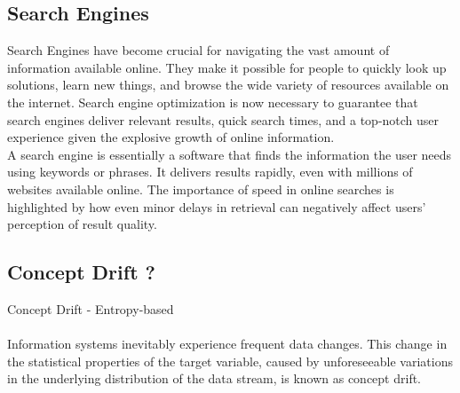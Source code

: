 \documentclass[10pt,oneside,english,a4paper]{article}
\begin{document}
\subsection{Search Engines}
Search Engines have become crucial for navigating the vast amount of information available online. They make it possible for people to quickly look up solutions, learn new things, and browse the wide variety of resources available on the internet. Search engine optimization is now necessary to guarantee that search engines deliver relevant results, quick search times, and a top-notch user experience given the explosive growth of online information.\\
A search engine is essentially a software that finds the information the user needs using keywords or phrases. It delivers results rapidly, even with millions of websites available online.
The importance of speed in online searches is highlighted by how even minor delays in retrieval can negatively affect users' perception of result quality.
\cite{pub.1171882357}

\clearpage
\subsection{Concept Drift ?}
Concept Drift - Entropy-based\\\\
Information systems inevitably experience frequent data changes. 
This change in the statistical properties of the target variable, caused by
unforeseeable variations in the underlying distribution of the data
stream, is known as concept drift.\cite{Sun2024}
\end{document}

